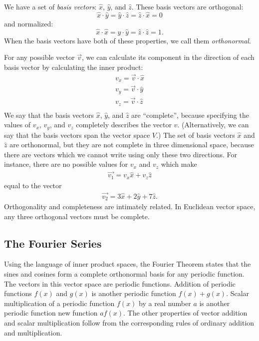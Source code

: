 \documentclass[12pt]{book}
\begin{document}
\noindent
We have a set of {\em basis vectors}: $\hat{x}$, $\hat{y}$, and $\hat{z}$.  These basis vectors are orthogonal:
\begin{displaymath}
\hat{x} \cdot \hat{y} = \hat{y} \cdot \hat{z} = \hat{z} \cdot \hat{x} = 0
\end{displaymath}
and normalized:
\begin{displaymath}
\hat{x} \cdot \hat{x} = \hat{y} \cdot \hat{y} = \hat{z} \cdot \hat{z} = 1.
\end{displaymath}
When the basis vectors have both of these properties, we call them {\em orthonormal}.

For any possible vector $\vec{v}$, we can calculate its component in the direction of each basis vector by calculating the inner product:
\begin{eqnarray*}
v_x = \vec{v} \cdot \hat{x} \\
v_y = \vec{v} \cdot \hat{y} \\
v_z = \vec{v} \cdot \hat{z} \\
\end{eqnarray*}
We say that the basis vectors $\hat{x}$, $\hat{y}$, and $\hat{z}$ are ``complete'', because specifying the values of $v_x$, $v_y$, and $v_z$ completely describes the vector $v$.  (Alternatively, we can say that the basis vectors span the vector space $V$.)  The set of basis vectors $\hat{x}$ and $\hat{z}$ are orthonormal, but they are not complete in three dimensional space, because there are vectors which we cannot write using only these two directions.  For instance, there are no possible values for $v_x$ and $v_z$
which make
\begin{eqnarray*}
 \vec{v_1} = v_x \hat{x} + v_z \hat{z}
\end{eqnarray*}
equal to the vector
\begin{eqnarray*}
 \vec{v_2} = 3 \hat{x} + 2 \hat{y} + 7 \hat{z}.
\end{eqnarray*}
Orthogonality and completeness are intimately related.  In Euclidean vector space, any three orthogonal vectors must be complete.
 
\subsection{The Fourier Series}

Using the language of inner product spaces, the Fourier Theorem states that the sines and cosines form a complete orthonormal basis for any periodic function.  The vectors in this vector space are periodic functions.  Addition of periodic functions $f(x)$ and $g(x)$ is another periodic function $f(x) + g(x)$.  Scalar multiplication of a periodic function $f(x)$ by a real number $a$ is another periodic function new function $a f(x)$.  The other properties of vector addition and scalar multiplication follow from the corresponding rules of ordinary addition and multiplication.
\end{document}
